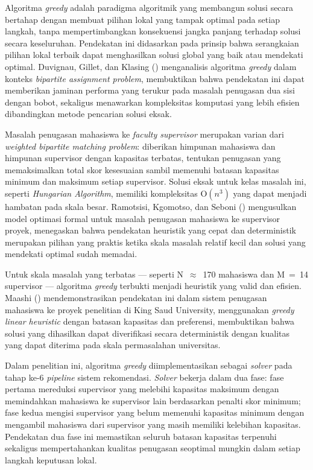 Algoritma \textit{greedy} adalah paradigma algoritmik yang membangun solusi secara bertahap dengan membuat pilihan lokal yang tampak optimal pada setiap langkah, tanpa mempertimbangkan konsekuensi jangka panjang terhadap solusi secara keseluruhan. Pendekatan ini didasarkan pada prinsip bahwa serangkaian pilihan lokal terbaik dapat menghasilkan solusi global yang baik atau mendekati optimal. Duvignau, Gillet, dan Klasing (\citeyear{duvignau2023greediness}) menganalisis algoritma \textit{greedy} dalam konteks \textit{bipartite assignment problem}, membuktikan bahwa pendekatan ini dapat memberikan jaminan performa yang terukur pada masalah penugasan dua sisi dengan bobot, sekaligus menawarkan kompleksitas komputasi yang lebih efisien dibandingkan metode pencarian solusi eksak.

Masalah penugasan mahasiswa ke \textit{faculty supervisor} merupakan varian dari \textit{weighted bipartite matching problem}: diberikan himpunan mahasiswa dan himpunan supervisor dengan kapasitas terbatas, tentukan penugasan yang memaksimalkan total skor kesesuaian sambil memenuhi batasan kapasitas minimum dan maksimum setiap supervisor. Solusi eksak untuk kelas masalah ini, seperti \textit{Hungarian Algorithm}, memiliki kompleksitas O$(n^3)$ yang dapat menjadi hambatan pada skala besar. Ramotsisi, Kgomotso, dan Seboni (\citeyear{ramotsisi2022optimization}) mengusulkan model optimasi formal untuk masalah penugasan mahasiswa ke supervisor proyek, menegaskan bahwa pendekatan heuristik yang cepat dan deterministik merupakan pilihan yang praktis ketika skala masalah relatif kecil dan solusi yang mendekati optimal sudah memadai.

Untuk skala masalah yang terbatas --- seperti N~$\approx$~170 mahasiswa dan M~=~14 supervisor --- algoritma \textit{greedy} terbukti menjadi heuristik yang valid dan efisien. Maashi (\citeyear{maashi2020greedy}) mendemonstrasikan pendekatan ini dalam sistem penugasan mahasiswa ke proyek penelitian di King Saud University, menggunakan \textit{greedy linear heuristic} dengan batasan kapasitas dan preferensi, membuktikan bahwa solusi yang dihasilkan dapat diverifikasi secara deterministik dengan kualitas yang dapat diterima pada skala permasalahan universitas.

Dalam penelitian ini, algoritma \textit{greedy} diimplementasikan sebagai \textit{solver} pada tahap ke-6 \textit{pipeline} sistem rekomendasi. \textit{Solver} bekerja dalam dua fase: fase pertama mereduksi supervisor yang melebihi kapasitas maksimum dengan memindahkan mahasiswa ke supervisor lain berdasarkan penalti skor minimum; fase kedua mengisi supervisor yang belum memenuhi kapasitas minimum dengan mengambil mahasiswa dari supervisor yang masih memiliki kelebihan kapasitas. Pendekatan dua fase ini memastikan seluruh batasan kapasitas terpenuhi sekaligus mempertahankan kualitas penugasan seoptimal mungkin dalam setiap langkah keputusan lokal.

